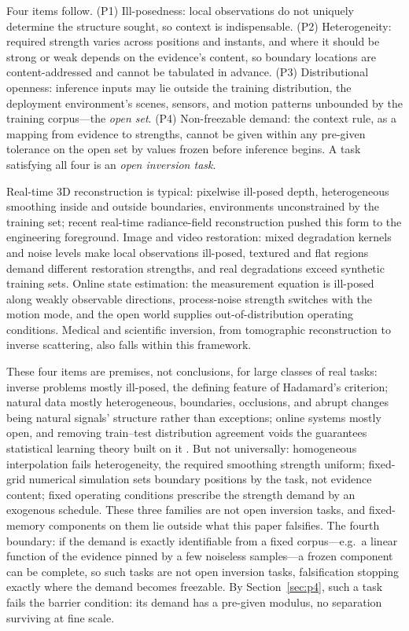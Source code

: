 Four items follow. (P1) Ill-posedness: local observations do not uniquely determine the structure sought, so context is indispensable. (P2) Heterogeneity: required strength varies across positions and instants, and where it should be strong or weak depends on the evidence's content, so boundary locations are content-addressed and cannot be tabulated in advance. (P3) Distributional openness: inference inputs may lie outside the training distribution, the deployment environment's scenes, sensors, and motion patterns unbounded by the training corpus---the \emph{open set}. (P4) Non-freezable demand: the context rule, as a mapping from evidence to strengths, cannot be given within any pre-given tolerance on the open set by values frozen before inference begins. A task satisfying all four is an \emph{open inversion task}.

Real-time 3D reconstruction is typical: pixelwise ill-posed depth, heterogeneous smoothing inside and outside boundaries, environments unconstrained by the training set; recent real-time radiance-field reconstruction \citep{kerbl2023} pushed this form to the engineering foreground. Image and video restoration: mixed degradation kernels and noise levels make local observations ill-posed, textured and flat regions demand different restoration strengths, and real degradations exceed synthetic training sets. Online state estimation: the measurement equation is ill-posed along weakly observable directions, process-noise strength switches with the motion mode, and the open world supplies out-of-distribution operating conditions. Medical and scientific inversion, from tomographic reconstruction to inverse scattering, also falls within this framework.

These four items are premises, not conclusions, for large classes of real tasks: inverse problems mostly ill-posed, the defining feature of Hadamard's criterion; natural data mostly heterogeneous, boundaries, occlusions, and abrupt changes being natural signals' structure rather than exceptions; online systems mostly open, and removing train--test distribution agreement voids the guarantees statistical learning theory built on it \citep{vapnik1995}. But not universally: homogeneous interpolation fails heterogeneity, the required smoothing strength uniform; fixed-grid numerical simulation sets boundary positions by the task, not evidence content; fixed operating conditions prescribe the strength demand by an exogenous schedule. These three families are not open inversion tasks, and fixed-memory components on them lie outside what this paper falsifies. The fourth boundary: if the demand is exactly identifiable from a fixed corpus---e.g.\ a linear function of the evidence pinned by a few noiseless samples---a frozen component can be complete, so such tasks are not open inversion tasks, falsification stopping exactly where the demand becomes freezable. By Section~\ref{sec:p4}, such a task fails the barrier condition: its demand has a pre-given modulus, no separation surviving at fine scale.

